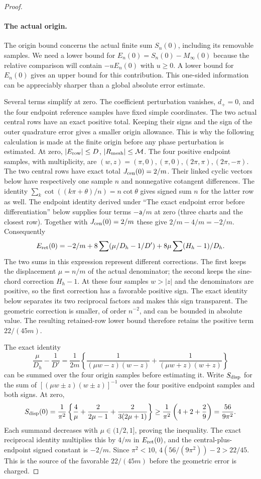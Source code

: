 \begin{proof}
\paragraph{The actual origin.}

The origin bound concerns the actual finite sum $S_n(0)$, including
its removable samples. We need a lower bound for
$E_n(0)=S_n(0)-M_\infty(0)$ because the relative comparison will
contain $-uE_n(0)$ with $u\geq0$. A lower bound for $E_n(0)$ gives
an upper bound for this contribution. This one-sided information can
be appreciably sharper than a global absolute error estimate.

Several terms simplify at zero. The coefficient perturbation vanishes,
$d_+=0$, and the four endpoint reference samples have fixed simple
coordinates. The two actual central rows have an exact positive total.
Keeping their signs and the sign of the outer quadrature error gives
a smaller origin allowance. This is why the following calculation is
made at the finite origin before any phase perturbation is estimated.
At zero, $|E_{\rm row}|\leq D$, $|R_{\rm mesh}|\leq\mathcal M$.
The four positive endpoint samples, with multiplicity, are
$(w,z)=(\pi,0),(\pi,0),(2\pi,\pi),(2\pi,-\pi)$.
The two central rows have exact total $J_{\rm cen}(0)=2/m$.
Their linked cyclic vectors below have respectively one sample $n$
and nonnegative cotangent differences. The identity
$\sum_k\cot((k\pi+\theta)/n)=n\cot\theta$ gives signed sum $n$
for the latter row as well.
The endpoint identity derived under ``The exact endpoint error before
differentiation'' below supplies four terms $-\mathsf a/m$ at zero
(three charts and the closest row). Together with $J_{\rm cen}(0)=2/m$
these give $2/m-4/m=-2/m$. Consequently
\[
 E_{\rm ret}(0)=-2/m+8\sum(\mu/D_h-1/D')
                         +8\mu\sum(H_h-1)/D_h.
\]
The two sums in this expression represent different corrections.
The first keeps the displacement $\mu=n/m$ of the actual denominator;
the second keeps the sine-chord correction $H_h-1$. At these four
samples $w>|z|$ and the denominators are positive, so the first
correction has a favorable positive sign. The exact identity below
separates its two reciprocal factors and makes this sign transparent.
The geometric correction is smaller, of order $n^{-2}$, and can be
bounded in absolute value. The resulting retained-row lower bound
therefore retains the positive term $22/(45m)$.

The exact identity
\[
 \frac\mu{D_h}-\frac1{D'}=\frac1{2m}
 \left\{\frac1{(\mu w-z)(w-z)}+
              \frac1{(\mu w+z)(w+z)}\right\}
\]
can be summed over the four origin samples before estimating it.
Write $S_{\rm disp}$ for the sum of
$[(\mu w\pm z)(w\pm z)]^{-1}$ over the four positive endpoint
samples and both signs. At zero,
\[
 S_{\rm disp}(0)=\frac1{\pi^2}
   \left\{\frac4\mu+\frac2{2\mu-1}+\frac2{3(2\mu+1)}\right\}
 \geq\frac1{\pi^2}\left(4+2+\frac29\right)=\frac{56}{9\pi^2}.
\]
Each summand decreases with $\mu\in(1/2,1]$, proving the inequality.
The exact reciprocal identity multiplies this by $4/m$ in
$E_{\rm ret}(0)$, and the central-plus-endpoint signed constant is
$-2/m$. Since $\pi^2<10$,
$4(56/(9\pi^2))-2>22/45$. This is the source of the favorable
$22/(45m)$ before the geometric error is charged.


\end{proof}

